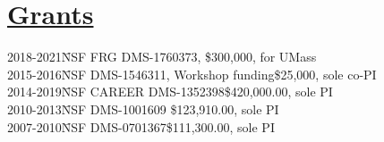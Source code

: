 \documentclass[11pt]{amsart}
\theoremstyle{plain}
\theoremstyle{definition}
\theoremstyle{remark}
\begin{document}




\section*{\Large\underline{Grants}}
\begin{tabbing}
 2018-2021\qquad\quad\=NSF FRG DMS-1760373, \quad\quad\quad\quad \quad\quad\quad\quad \;  \$300,000,  for UMass\\ 
2015-2016\qquad\quad\=NSF DMS-1546311, Workshop funding\quad\quad\quad \$25,000, sole co-PI\\
2014-2019\qquad\quad\=NSF CAREER DMS-1352398\quad\quad\quad\quad\quad\quad\;\;\;\$420,000.00, sole PI\\
2010-2013\qquad\quad\=NSF DMS-1001609\quad\quad
\quad\quad\quad\quad\quad\quad\quad\quad\quad\;\;\$123,910.00, sole PI\\
2007-2010\qquad\quad\=NSF
DMS-0701367\quad\quad\quad\quad\quad\quad\quad\quad\quad\quad\quad\;\;\$111,300.00, sole PI\\
\end{tabbing}
\end{document}
